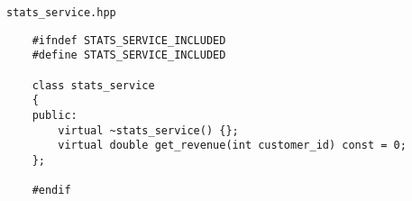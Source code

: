 \texttt{stats_service.hpp}

\begin{verbatim}
    #ifndef STATS_SERVICE_INCLUDED
    #define STATS_SERVICE_INCLUDED
    
    class stats_service
    {
    public:
        virtual ~stats_service() {};
        virtual double get_revenue(int customer_id) const = 0;
    };
    
    #endif
\end{verbatim}